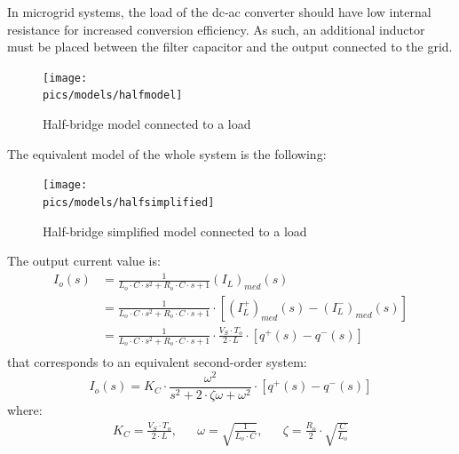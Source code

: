 In microgrid systems, the load of the \gls{dc}-\gls{ac} converter should have low internal resistance for increased conversion efficiency.
As such, an additional inductor must be placed between the filter capacitor and the output connected to the grid.
\begin{figure}[!ht]
    \begin{center}\texttt{[image: \\pics/models/halfmodel]}\end{center}
    \caption{Half-bridge model connected to a load}
    \label{fig:halfmodel}
\end{figure}
The equivalent model of the whole system is the following:
\begin{figure}[!ht]
    \begin{center}\texttt{[image: \\pics/models/halfsimplified]}\end{center}
    \caption{Half-bridge simplified model connected to a load}
    \label{fig:halfsimplified}
\end{figure}
The output current value is:
\begin{equation}
    \begin{split}
        I_o(s) &= \frac{1}{L_o \cdot C \cdot s^2 + R_o \cdot C \cdot s + 1}(I_L)_{med}(s) \\
        &= \frac{1}{L_o \cdot C \cdot s^2 + R_o \cdot C \cdot s + 1} \cdot \left[(I_L^+)_{med}(s) - (I_L^-)_{med}(s)\right] \\
        &= \frac{1}{L_o \cdot C \cdot s^2 + R_o \cdot C \cdot s + 1} \cdot \frac{V_S \cdot T_o}{2 \cdot L} \cdot \left[q^+(s) - q^-(s)\right] \\
    \end{split}
\end{equation}
that corresponds to an equivalent second-order system:
\begin{equation}
    I_o(s) = K_C \cdot \frac{\omega^2}{s^2 + 2 \cdot \zeta \omega + \omega^2} \cdot \left[q^+(s) - q^-(s)\right]
\end{equation}
where:
\begin{align*}
    K_C = \frac{V_S \cdot T_o}{2 \cdot L},  &&   \omega = \sqrt{\frac{1}{L_o \cdot C}},  &&   \zeta = \frac{R_o}{2} \cdot \sqrt{\frac{C}{L_o}}
\end{align*}

